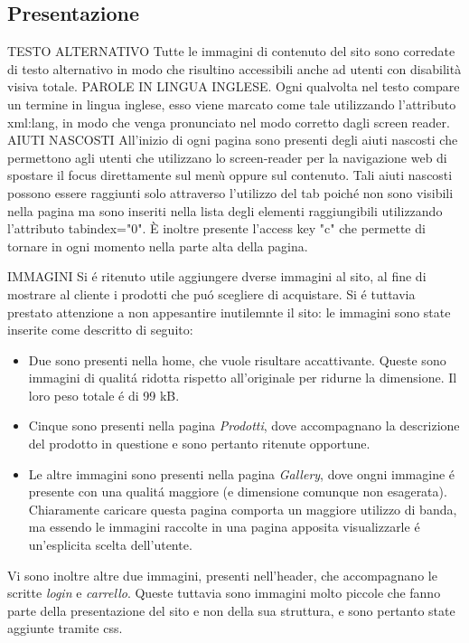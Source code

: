     \subsection{Presentazione}
		TESTO ALTERNATIVO
		Tutte le immagini di contenuto del sito sono corredate di testo alternativo in modo che risultino accessibili anche ad utenti con disabilità visiva totale.
		PAROLE IN LINGUA INGLESE.
		Ogni qualvolta nel testo compare un termine in lingua inglese, esso viene marcato come tale utilizzando l'attributo xml:lang, in modo che venga pronunciato nel modo corretto dagli screen reader.
		AIUTI NASCOSTI
		All'inizio di ogni pagina sono presenti degli aiuti nascosti che permettono agli utenti che utilizzano lo screen-reader per la navigazione web di spostare il focus direttamente sul menù oppure sul contenuto.
		Tali aiuti nascosti possono essere raggiunti solo attraverso l'utilizzo del tab poiché non sono visibili nella pagina ma sono inseriti nella lista degli elementi raggiungibili utilizzando l'attributo tabindex="0".
		È inoltre presente l'access key "c" che permette di tornare in ogni momento nella parte alta della pagina.

		IMMAGINI
		Si \'e ritenuto utile aggiungere dverse immagini al sito, al fine di mostrare al cliente i prodotti che pu\'o scegliere di acquistare.
		Si \'e tuttavia prestato attenzione a non appesantire inutilemnte il sito: le immagini sono state inserite come descritto di seguito:
		\begin{itemize}
		\item Due sono presenti nella home, che vuole risultare accattivante. Queste sono immagini di qualit\'a ridotta rispetto all'originale per ridurne la dimensione. Il loro peso totale \'e di 99 kB.
		\item Cinque sono presenti nella pagina \emph{Prodotti}, dove accompagnano la descrizione del prodotto in questione e sono pertanto ritenute opportune.
		\item Le altre immagini sono presenti nella pagina \emph{Gallery}, dove ongni immagine \'e presente con una qualit\'a maggiore (e dimensione comunque non esagerata). Chiaramente caricare questa pagina comporta un maggiore utilizzo di banda, ma essendo le immagini raccolte in una pagina apposita visualizzarle \'e un'esplicita scelta dell'utente.
		\end{itemize}
		Vi sono inoltre altre due immagini, presenti nell'header, che accompagnano le scritte \emph{login} e \emph{carrello}.
		Queste tuttavia sono immagini molto piccole che fanno parte della presentazione del sito e non della sua struttura, e sono pertanto state aggiunte tramite css.


